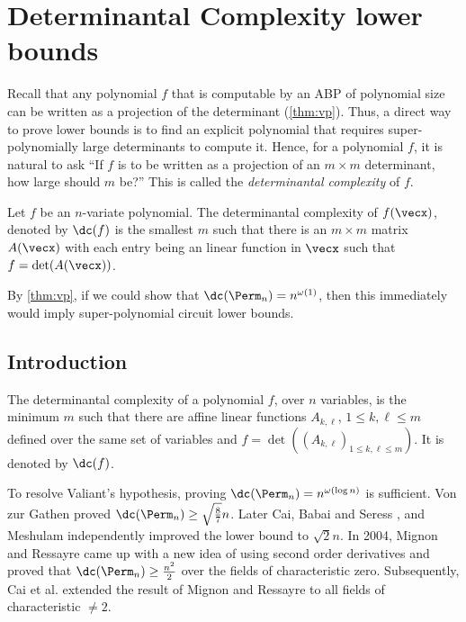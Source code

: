 \chapter{Determinantal Complexity lower bounds}\label{chap:dc}

Recall that any polynomial $f$ that is computable by an ABP of polynomial size can be written as a projection of the determinant (\autoref{thm:vp}). 
Thus, a direct way to prove lower bounds is to find an explicit polynomial that requires super-polynomially large determinants to compute it. 
Hence, for a polynomial $f$, it is natural to ask ``If $f$ is to be written as a projection of an $m\times m$ determinant, how large should $m$ be?''
This is called the \emph{determinantal complexity} of $f$. 

\begin{definition}
  Let $f$ be an $n$-variate polynomial.
  The determinantal complexity of $f(\vecx)$, denoted by $\dc(f)$ is the smallest $m$ such that there is an $m\times m$ matrix $A(\vecx)$ with each entry being an linear function in $\vecx$ such that $f = \det(A(\vecx))$. 
\end{definition}

\noindent
By \autoref{thm:vp}, if we could show that $\dc(\Perm_n) = n^{\omega(1)}$, then this immediately would imply super-polynomial circuit lower bounds. 

\section{Introduction}
\begin{definition}
  The determinantal complexity of a polynomial $f$, over $n$ variables, is the minimum $m$ such that there are affine linear functions $A_{k,\ell}$, $1\leq k,\ell\leq m$ defined over the same set of variables and $f= \det((A_{k,\ell})_{1 \leq k,\ell \leq m})$. It is denoted by $\dc(f)$.  
\end{definition}
To resolve Valiant's hypothesis, proving $\dc(\Perm_n) = n^{\omega(\log n)}$ is sufficient. Von zur Gathen \cite{von1986}  proved $\dc(\Perm_n) \geq \sqrt{\frac{8}{7}}n$. Later Cai\cite{cai1990}, Babai and Seress \cite{von1987}, and Meshulam\cite{mesh1989} independently improved the lower bound to $\sqrt{2}n$. In 2004, Mignon and Ressayre\cite{mr04} came up with a new idea of using second order derivatives and proved that $\dc(\Perm_n) \geq \frac{n^2}{2}$ over the fields of characteristic zero. Subsequently, Cai et al.\cite{ccl2008} extended the result of Mignon and Ressayre to all fields of characteristic $\neq 2$.

